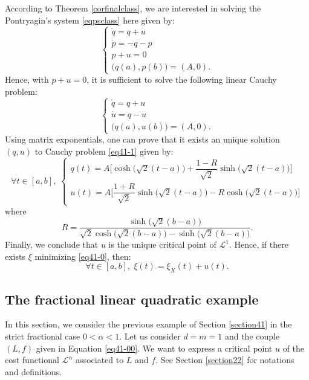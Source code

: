 \documentclass[english,11pt,reqno]{smfart}
\newcommand{\LL}{\mathcal{L}}
\begin{document}
According to Theorem \ref{corfinalclass}, we are interested in solving the Pontryagin's system \eqref{eqpsclass} here given by:
\begin{equation}
 \left\lbrace \begin{array}{l}
 		\dot{q} = q+u \\
 		\dot{p} = - q-p \\
	    p+u = 0 \\
	    \big( q(a),p(b) \big) = ( A,0 ).
        \end{array}
\right.
\end{equation}
Hence, with $p+u = 0$, it is sufficient to solve the following linear Cauchy problem:
\begin{equation}\label{eq41-1}
 \left\lbrace \begin{array}{l}
 		\dot{q} = q+u \\
 		\dot{u} = q-u \\
	    \big( q(a),u(b) \big) = ( A,0 ).
        \end{array}
\right.
\end{equation}
Using matrix exponentials, one can prove that it exists an unique solution $(q,u)$ to Cauchy problem \eqref{eq41-1} given by:
\begin{equation}
\forall t \in [a,b], \; \left\lbrace \begin{array}{l}
 		q(t) = A \Big[ \cosh \big( \sqrt{2}(t-a)\big)+\dfrac{1-R}{\sqrt{2}} \sinh \big( \sqrt{2}(t-a)\big) \Big] \\[10pt]
 		u(t) = A \Big[\dfrac{1+R}{\sqrt{2}} \sinh \big( \sqrt{2}(t-a)\big)- R \cosh \big( \sqrt{2}(t-a)\big) \Big]
        \end{array}
\right.
\end{equation}
where
\begin{equation}
R=\dfrac{\sinh \big( \sqrt{2}(b-a)\big)}{\sqrt{2}\cosh \big( \sqrt{2}(b-a)\big)-\sinh \big( \sqrt{2}(b-a)\big)} .
\end{equation}
Finally, we conclude that $u$ is the unique critical point of $\LL^1$. Hence, if there exists $\xi$ minimizing \eqref{eq41-0}, then:
\begin{equation}
\forall t \in [a,b], \; \xi(t) = \xi_X (t) + u(t).
\end{equation}

\subsection{The fractional linear quadratic example}\label{section42}
In this section, we consider the previous example of Section \ref{section41} in the strict fractional case $0<\alpha <1$. Let us consider $d=m=1$ and the couple $(L,f)$ given in Equation \eqref{eq41-00}. We want to express a critical point $u$ of the cost functional $\LL^\alpha$ associated to $L$ and $f$. See Section \ref{section22} for notations and definitions. \\
\end{document}
